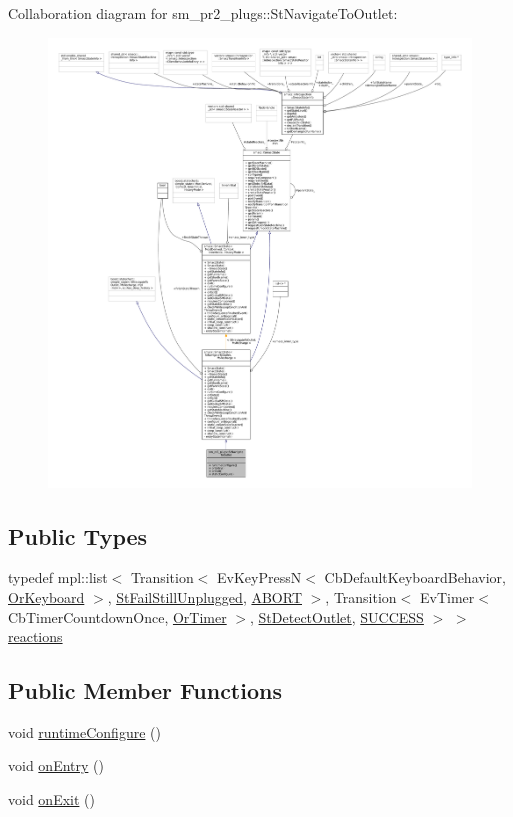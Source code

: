 Collaboration diagram for sm\+\_\+pr2\+\_\+plugs\+:\+:St\+Navigate\+To\+Outlet\+:
\nopagebreak
\begin{figure}[H]
\begin{center}
\leavevmode
\includegraphics[width=350pt]{structsm__pr2__plugs_1_1StNavigateToOutlet__coll__graph}
\end{center}
\end{figure}
\subsection*{Public Types}
\begin{DoxyCompactItemize}
\item 
typedef mpl\+::list$<$ Transition$<$ Ev\+Key\+PressN$<$ Cb\+Default\+Keyboard\+Behavior, \hyperlink{classsm__pr2__plugs_1_1OrKeyboard}{Or\+Keyboard} $>$, \hyperlink{structsm__pr2__plugs_1_1StFailStillUnplugged}{St\+Fail\+Still\+Unplugged}, \hyperlink{classABORT}{A\+B\+O\+RT} $>$, Transition$<$ Ev\+Timer$<$ Cb\+Timer\+Countdown\+Once, \hyperlink{classsm__pr2__plugs_1_1OrTimer}{Or\+Timer} $>$, \hyperlink{structsm__pr2__plugs_1_1StDetectOutlet}{St\+Detect\+Outlet}, \hyperlink{classSUCCESS}{S\+U\+C\+C\+E\+SS} $>$ $>$ \hyperlink{structsm__pr2__plugs_1_1StNavigateToOutlet_a4b5b4d30a2a64c438e9a4d89016fc052}{reactions}
\end{DoxyCompactItemize}
\subsection*{Public Member Functions}
\begin{DoxyCompactItemize}
\item 
void \hyperlink{structsm__pr2__plugs_1_1StNavigateToOutlet_aa36e4f478b3dc1c2b8fae6ef51f4d4f8}{runtime\+Configure} ()
\item 
void \hyperlink{structsm__pr2__plugs_1_1StNavigateToOutlet_a561f3edd99e9657c42d3c9de6340e637}{on\+Entry} ()
\item 
void \hyperlink{structsm__pr2__plugs_1_1StNavigateToOutlet_a7eeb2e87c9e4d0ccec94874a995e5213}{on\+Exit} ()
\end{DoxyCompactItemize}
